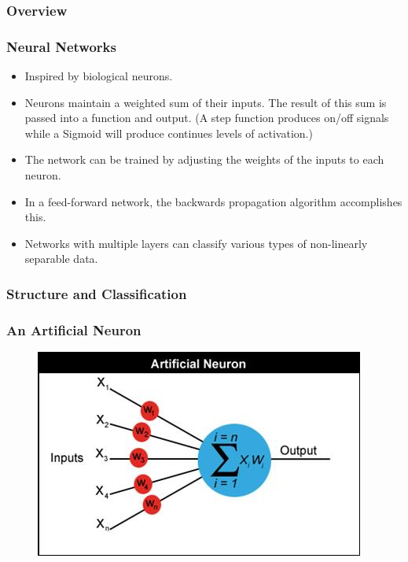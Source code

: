 \documentclass[mathserif]{beamer}
\begin{document}
	\subsubsection{Overview}
	\begin{frame}
		\frametitle{Neural Networks}
		\begin{itemize}
			\item Inspired by biological neurons.
			\item Neurons maintain a weighted sum of their inputs. The result of this sum is passed into a function and output. (A step function produces on/off signals while a Sigmoid will produce continues levels of activation.)
			\item The network can be trained by adjusting the weights of the inputs to each neuron.
			\item In a feed-forward network, the backwards propagation algorithm accomplishes this.
			\item Networks with multiple layers can classify various types of non-linearly separable data.
		\end{itemize}
	\end{frame}
	
	\subsubsection{Structure and Classification}
	\begin{frame}
		\frametitle{An Artificial Neuron}
		\begin{figure}
			\centering
			\includegraphics[keepaspectratio,scale=.9]{NN_1.jpg} \\
		\end{figure}
	\end{frame}
	
\end{document}
